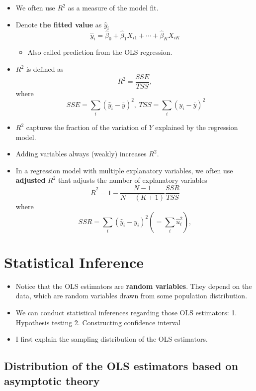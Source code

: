 \documentclass[]{book}
\providecommand{\tightlist}{%
  \setlength{\itemsep}{0pt}\setlength{\parskip}{0pt}}
\begin{document}
\begin{itemize}
\tightlist
\item
  We often use \(R^2\) as a measure of the model fit.
\item
  Denote \textbf{the fitted value} as \(\hat{y}_i\)
  \[
   \hat{y}_i = \hat{\beta}_0 + \hat{\beta}_1 X_{i1} + \cdots + \hat{\beta}_K X_{iK}
  \]

  \begin{itemize}
  \tightlist
  \item
    Also called prediction from the OLS regression.
  \end{itemize}
\item
  \(R^2\) is defined as
  \[
    R^2 = \frac{SSE}{TSS},
    \]
  where
  \[ 
     \  SSE = \sum_i (\hat{y}_i - \bar{y})^2, \ TSS = \sum_i (y_i - \bar{y})^2
    \]
\item
  \(R^2\) captures the fraction of the variation of \(Y\) explained by the regression model.
\item
  Adding variables always (weakly) increases \(R^2\).
\item
  In a regression model with multiple explanatory variables, we often use \textbf{adjusted} \(R^2\) that adjusts the number of explanatory variables
  \[
    \bar{R}^2 = 1 - \frac{N-1}{N-(K+1)} \frac{SSR}{TSS}
  \]
  where
  \[
    SSR = \sum_i (\hat{y}_i - y_i)^2 (= \sum_i \hat{u}_i^2 ),
    \]
\end{itemize}

\hypertarget{statistical-inference}{%
\section{Statistical Inference}\label{statistical-inference}}

\begin{itemize}
\tightlist
\item
  Notice that the OLS estimators are \textbf{random variables}. They depend on the data, which are random variables drawn from some population distribution.
\item
  We can conduct statistical inferences regarding those OLS estimators:
  1. Hypothesis testing
  2. Constructing confidence interval
\item
  I first explain the sampling distribution of the OLS estimators.
\end{itemize}

\hypertarget{distribution-of-the-ols-estimators-based-on-asymptotic-theory}{%
\subsection{Distribution of the OLS estimators based on asymptotic theory}\label{distribution-of-the-ols-estimators-based-on-asymptotic-theory}}
\end{document}
